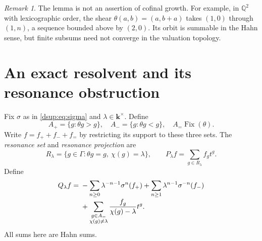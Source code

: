\documentclass[11pt,oneside]{article}
\numberwithin{equation}{section}
\theoremstyle{definition}
\theoremstyle{remark}
\newtheorem{remark}[theorem]{Remark}
\newcommand{\Q}{\mathbb Q}
\newcommand{\kk}{\mathbf k}
\newcommand{\Fix}{\operatorname{Fix}}
\begin{document}
\begin{remark}
The lemma is not an assertion of cofinal growth. For example, in
$\Q^2$ with lexicographic order, the shear
$\theta(a,b)=(a,b+a)$ takes $(1,0)$ through $(1,n)$, a sequence bounded
above by $(2,0)$. Its orbit is summable in the Hahn sense, but finite
subsums need not converge in the valuation topology.
\end{remark}

\section{An exact resolvent and its resonance obstruction}\label{dsup:sec:resolvent}

Fix $\sigma$ as in \eqref{dsup:eq:sigma} and $\lambda\in\kk^\times$. Define
\[
 A_+=\{g:\theta g>g\},\quad A_-=\{g:\theta g<g\},\quad
 A_=\Fix(\theta).
\]
Write $f=f_++f_-+f_=$ by restricting its support to these three sets. The
\emph{resonance set} and \emph{resonance projection} are
\begin{equation}\label{dsup:eq:resonance}
 R_\lambda=\{g\in\Gamma:\theta g=g,\ \chi(g)=\lambda\},
 \qquad P_\lambda f=\sum_{g\in R_\lambda}f_gt^g.
\end{equation}
Define
\begin{align}
 Q_\lambda f={}&-\sum_{n\ge0}\lambda^{-n-1}\sigma^n(f_+)
        +\sum_{n\ge1}\lambda^{n-1}\sigma^{-n}(f_-)
 \notag\\[-2pt]
 &+\sum_{\substack{g\in A_=\\\chi(g)\ne\lambda}}
           \frac{f_g}{\chi(g)-\lambda}t^g .\label{dsup:eq:Q}
\end{align}
All sums here are Hahn sums.
\end{document}
